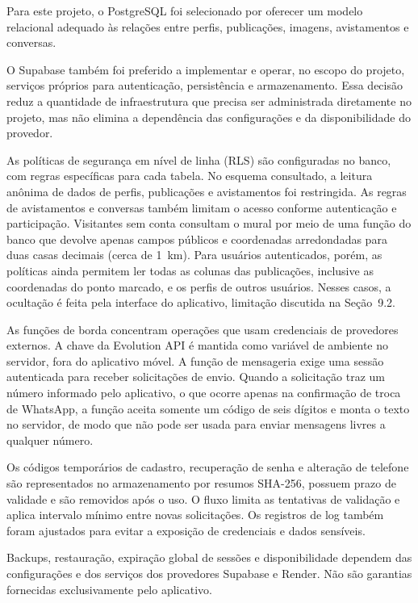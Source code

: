 Para este projeto, o PostgreSQL foi selecionado por oferecer um modelo relacional adequado às relações entre perfis, publicações, imagens, avistamentos e conversas.

O Supabase também foi preferido a implementar e operar, no escopo do projeto, serviços próprios para autenticação, persistência e armazenamento. Essa decisão reduz a quantidade de infraestrutura que precisa ser administrada diretamente no projeto, mas não elimina a dependência das configurações e da disponibilidade do provedor.

As políticas de segurança em nível de linha (RLS) são configuradas no banco, com regras específicas para cada tabela. No esquema consultado, a leitura anônima de dados de perfis, publicações e avistamentos foi restringida. As regras de avistamentos e conversas também limitam o acesso conforme autenticação e participação. Visitantes sem conta consultam o mural por meio de uma função do banco que devolve apenas campos públicos e coordenadas arredondadas para duas casas decimais (cerca de 1~km). Para usuários autenticados, porém, as políticas ainda permitem ler todas as colunas das publicações, inclusive as coordenadas do ponto marcado, e os perfis de outros usuários. Nesses casos, a ocultação é feita pela interface do aplicativo, limitação discutida na Seção~9.2.

As funções de borda concentram operações que usam credenciais de provedores externos. A chave da Evolution API é mantida como variável de ambiente no servidor, fora do aplicativo móvel. A função de mensageria exige uma sessão autenticada para receber solicitações de envio. Quando a solicitação traz um número informado pelo aplicativo, o que ocorre apenas na confirmação de troca de WhatsApp, a função aceita somente um código de seis dígitos e monta o texto no servidor, de modo que não pode ser usada para enviar mensagens livres a qualquer número.

Os códigos temporários de cadastro, recuperação de senha e alteração de telefone são representados no armazenamento por resumos SHA-256, possuem prazo de validade e são removidos após o uso. O fluxo limita as tentativas de validação e aplica intervalo mínimo entre novas solicitações. Os registros de log também foram ajustados para evitar a exposição de credenciais e dados sensíveis.

Backups, restauração, expiração global de sessões e disponibilidade dependem das configurações e dos serviços dos provedores Supabase e Render. Não são garantias fornecidas exclusivamente pelo aplicativo.

